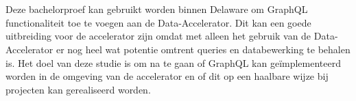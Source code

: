 
%
%
%
%
%

%



\chapter*{}

Deze bachelorproef kan gebruikt worden binnen Delaware om GraphQL functionaliteit toe te voegen aan de Data-Accelerator. Dit kan een goede uitbreiding voor de accelerator zijn omdat met alleen het gebruik van de Data-Accelerator er nog heel wat potentie omtrent queries en databewerking te behalen is. Het doel van deze studie is om na te gaan of GraphQL kan geïmplementeerd worden in de omgeving van de accelerator en of dit op een haalbare wijze bij projecten kan gerealiseerd worden.

